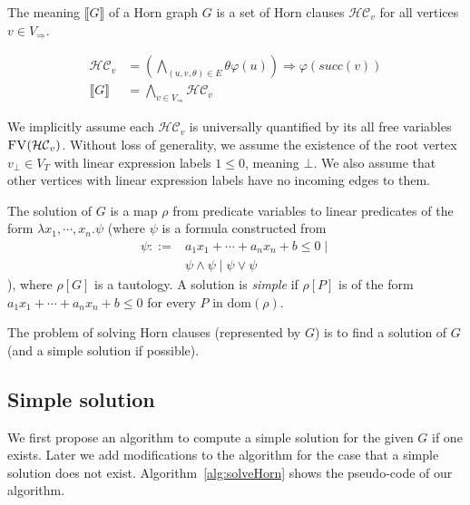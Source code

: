 \documentclass[a4paper,12pt]{article}
\begin{document}
The meaning $\llbracket G \rrbracket $ of a Horn graph $G$ is a set of
Horn clauses $\mathcal{HC}_v$ for all vertices $v \in V_\Rightarrow$.

\begin{align*}
\mathcal{HC}_v & = \left( \bigwedge_{(u,v,\theta) \in E} \theta \varphi(u) \right) \Longrightarrow \varphi(succ(v)) \\
\llbracket G \rrbracket & = \bigwedge_{v \in V_\Rightarrow} \mathcal{HC}_v
\end{align*}

We implicitly assume each $\mathcal{HC}_v$ is universally quantified
by its all free variables $\textsc{FV}(\mathcal{HC}_v)$.  Without loss
of generality, we assume the existence of the root vertex $v_\bot \in
V_T$ with linear expression labels $1 \leq 0$, meaning $\bot$. We also
assume that other vertices with linear expression labels have no
incoming edges to them.

The solution of $G$ is a map $\rho$ from predicate variables to linear
predicates of the form $\lambda x_1, \cdots ,x_n. \psi $ (where $\psi$
is a formula constructed from
\begin{align*}
\psi ::= & a_1 x_1 + \cdots + a_n x_n + b \leq 0 \mid \\
& \psi \wedge \psi \mid \psi \vee \psi
\end{align*}
), where $\rho[G]$ is a tautology. A solution is \textit{simple} if
$\rho[P]$ is of the form $a_1 x_1 + \cdots + a_n x_n + b \leq 0$ for every
$P$ in $\mathrm{dom}(\rho)$.

The problem of solving Horn clauses (represented by $G$) is to find a
solution of $G$ (and a simple solution if possible).

\subsection{Simple solution}

We first propose an algorithm to compute a simple solution for the
given $G$ if one exists.  Later we add modifications to the algorithm
for the case that a simple solution does not exist.  Algorithm~\ref{alg:solveHorn} shows the pseudo-code of our algorithm.

\newcommand{\solveHorn}{\ensuremath{\mbox{\sc SolveHornGraph}}}
\newcommand{\genConstr}{\ensuremath{\mbox{\sc GenerateConstraint}}}
\newcommand{\splitGraph}{\ensuremath{\mbox{\sc RestructureGraph}}}
\end{document}
